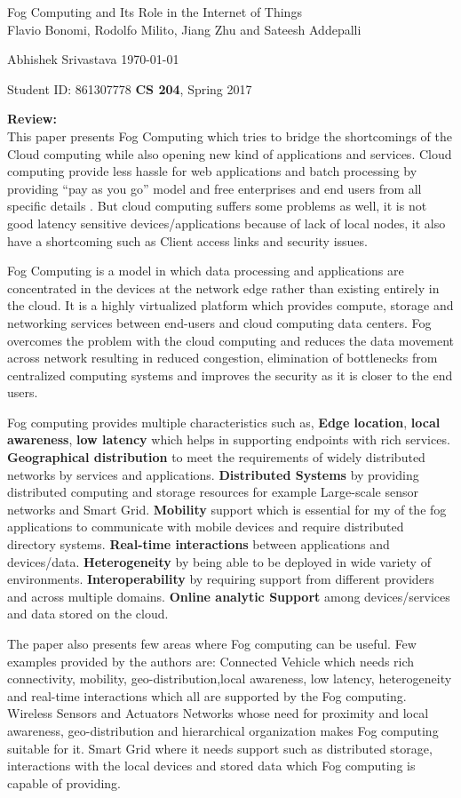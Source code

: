\documentclass[a4paper,12pt, twoside]{article}
\renewcommand{\maketitle}{%
 	\Large
 	\begin{center}
 	Fog Computing and Its Role in the Internet of Things\\	
 	\normalsize Flavio Bonomi, Rodolfo Milito, Jiang Zhu and Sateesh Addepalli
 	\end{center}
 
 	\Large
	Abhishek Srivastava
	\hfill
	\normalsize
	\today
 	\par
 	Student ID: 861307778
 	\hfill
 	\textbf{CS 204}, Spring 2017
 	\par 	
 	\hrulefill
 	\par
 	}
\begin{document}
\thispagestyle{empty}
	
\maketitle

\textbf{Review:}\\

This paper presents Fog Computing which tries to bridge the shortcomings of the Cloud computing while also opening new kind of applications and services. Cloud computing provide less hassle for web applications and batch processing by providing ``pay as you go'' model and free enterprises and end users from all specific details . But cloud computing suffers some problems as well, it is not good latency sensitive devices/applications because of lack of local nodes, it also have a shortcoming such as Client access links and security issues.  

Fog Computing is a model in which data processing and applications are concentrated in the devices at the network edge rather than existing entirely in the cloud. It is a highly virtualized platform which provides compute, storage and networking services between end-users and cloud computing data centers. Fog overcomes the problem with the cloud computing and reduces the data movement across network resulting in reduced congestion, elimination of bottlenecks from centralized computing systems and improves the security as it is closer to the end users.

Fog computing provides multiple characteristics such as, \textbf{Edge location}, \textbf{local awareness}, \textbf{low latency} which helps in supporting endpoints with rich services. \textbf{Geographical distribution} to meet the requirements of widely distributed networks by services and applications. \textbf{ Distributed Systems} by providing distributed computing and storage resources for example Large-scale sensor networks and Smart Grid. \textbf{Mobility} support which is essential for my of the fog applications to communicate with mobile devices and require distributed directory systems. \textbf{Real-time interactions} between applications and devices/data. \textbf{Heterogeneity} by being able to be deployed in  wide variety of environments. \textbf{Interoperability} by requiring support from different providers and across multiple domains. \textbf{Online analytic Support} among devices/services and data stored on the cloud.

The paper also presents few areas where Fog computing can be useful. Few examples provided by the authors are: Connected Vehicle which needs rich connectivity, mobility, geo-distribution,local awareness, low latency, heterogeneity and real-time interactions which all are supported by the Fog computing. Wireless Sensors and Actuators Networks whose need for proximity and local awareness, geo-distribution and hierarchical organization makes Fog computing suitable for it. Smart Grid where it needs support such as distributed storage, interactions with the local devices and stored data which Fog computing is capable of providing.\\
\end{document}
